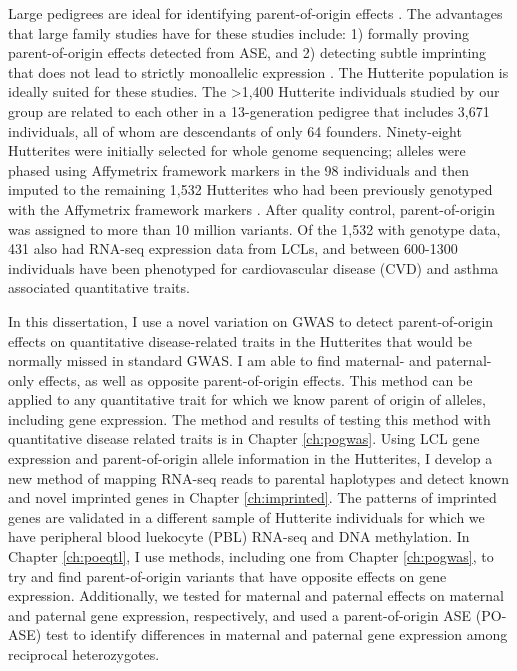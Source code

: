 Large pedigrees are ideal for identifying parent-of-origin effects \cite{Baran:2015cx}. The advantages that large family studies have for these studies include: 1) formally proving parent-of-origin effects detected from ASE, and 2) detecting subtle imprinting that does not lead to strictly monoallelic expression \cite{Baran:2015cx}. The Hutterite population is ideally suited for these studies. The \textgreater 1,400 Hutterite individuals studied by our group are related to each other in a 13-generation pedigree that includes 3,671 individuals, all of whom are descendants of only 64 founders. Ninety-eight Hutterites were initially selected for whole genome sequencing; alleles were phased using Affymetrix framework markers in the 98 individuals and then imputed to the remaining 1,532 Hutterites who had been previously genotyped with the Affymetrix framework markers \cite{Livne2015}. After quality control, parent-of-origin was assigned to more than 10 million variants. Of the 1,532 with genotype data, 431 also had RNA-seq expression data from LCLs, and between 600-1300 individuals have been phenotyped for cardiovascular disease (CVD) and asthma associated quantitative traits.


In this dissertation, I use a novel variation on GWAS to detect parent-of-origin effects on quantitative disease-related traits in the Hutterites that would be normally missed in standard GWAS. I am able to find maternal- and paternal-only effects, as well as opposite parent-of-origin effects. This method can be applied to any quantitative trait for which we know parent of origin of alleles, including gene expression. The method and results of testing this method with quantitative disease related traits is in Chapter \ref{ch:pogwas}. Using LCL gene expression and parent-of-origin allele information in the Hutterites, I develop a new method of mapping RNA-seq reads to parental haplotypes and detect known and novel imprinted genes in Chapter \ref{ch:imprinted}. The patterns of imprinted genes are validated in a different sample of Hutterite individuals for which we have peripheral blood luekocyte (PBL) RNA-seq and DNA methylation. In Chapter \ref{ch:poeqtl}, I use methods, including one from Chapter \ref{ch:pogwas}, to try and find parent-of-origin variants that have opposite effects on gene expression. Additionally, we tested for maternal and paternal effects on maternal and paternal gene expression, respectively, and used a parent-of-origin ASE (PO-ASE) test to identify differences in maternal and paternal gene expression among reciprocal heterozygotes. 

